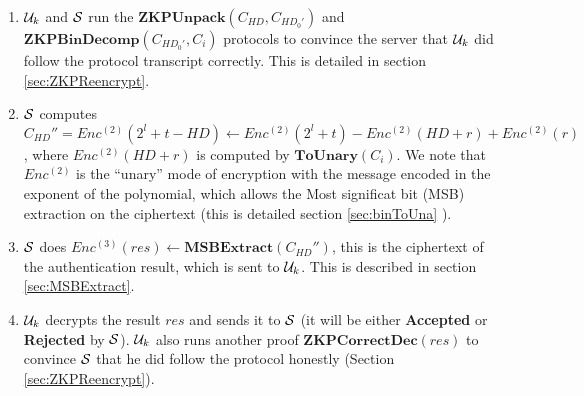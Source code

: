 \begin{description}
\begin{enumerate}
		\item $\mathcal{U}_k$ and $\mathcal{S}$ run the $\mathbf{ZKPUnpack}(C_{HD},C_{HD_0'})$ and
		$\mathbf{ZKPBinDecomp}(C_{HD_0'},C_i)$
		protocols to convince the server that
		$\mathcal{U}_k$ did follow the protocol transcript correctly. This is detailed
		in section
		\ref{sec:ZKPReencrypt}.
		\label{protocol:step6}
		\item $\mathcal{S}$ computes $C_{HD}'' = Enc^{(2)}(2^l + t - HD) \gets
		Enc^{(2)}(2^l + t) - Enc^{(2)}(HD+r) + Enc^{(2)}(r)$, where
		$Enc^{(2)}(HD + r)$ is computed by $\mathbf{ToUnary}(C_i)$. We note that
		$Enc^{(2)}$ is the ``unary'' mode of encryption with the message
		encoded in the exponent of the polynomial, which allows the
		Most significat bit (MSB)
		extraction on the ciphertext (this is detailed section \ref{sec:binToUna} \label{protocol:step7}).
		\item $\mathcal{S}$ does $Enc^{(3)}(res) \gets
		\mathbf{MSBExtract}(C_{HD}'')$, this is the ciphertext
		of the authentication result, which is sent to $\mathcal{U}_k$. This
		is described in section \ref{sec:MSBExtract}.
		\label{protocol:step8}
		\item $\mathcal{U}_k$ decrypts the result $res$ and sends it to $\mathcal{S}$
		(it will be either \textbf{Accepted} or \textbf{Rejected} by $\mathcal{S}$).
		$\mathcal{U}_k$ also runs another proof $\mathbf{ZKPCorrectDec}(res)$
		to convince $\mathcal{S}$ that he
		did follow the protocol honestly (Section \ref{sec:ZKPReencrypt}).\label{protocol:step9}








\end{enumerate}
\end{description}
